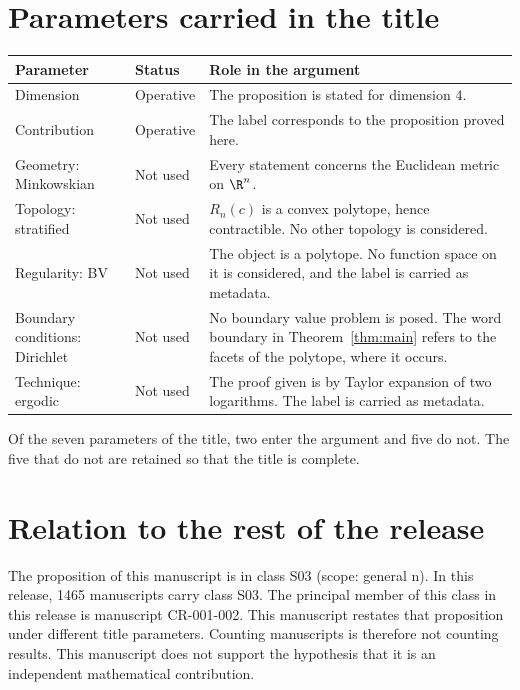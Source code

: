 \documentclass[11pt]{article}
\begin{document}
\section{Parameters carried in the title}\label{sec:params}
\begin{center}
\small
\begin{tabular}{p{}p{}p{}}
\toprule
Parameter & Status & Role in the argument \\
\midrule
Dimension & Operative & The proposition is stated for dimension $4$. \\
Contribution & Operative & The label corresponds to the proposition proved here. \\
Geometry: Minkowskian & Not used & Every statement concerns the Euclidean metric on $\R^n$. \\
Topology: stratified & Not used & $R_n(c)$ is a convex polytope, hence contractible. No other topology is considered. \\
Regularity: BV & Not used & The object is a polytope. No function space on it is considered, and the label is carried as metadata. \\
Boundary conditions: Dirichlet & Not used & No boundary value problem is posed. The word boundary in Theorem~\ref{thm:main} refers to the facets of the polytope, where it occurs. \\
Technique: ergodic & Not used & The proof given is by Taylor expansion of two logarithms. The label is carried as metadata. \\
\bottomrule
\end{tabular}
\end{center}
Of the seven parameters of the title, two enter the argument and five do not. The five that do not are retained so that the title is complete.

\section{Relation to the rest of the release}
The proposition of this manuscript is in class S03 (scope: general n).
In this release, 1465 manuscripts carry class S03. The principal member of this class in this release is manuscript CR-001-002. This manuscript restates that proposition under different title parameters.
Counting manuscripts is therefore not counting results. This manuscript does not support the hypothesis that it is an independent mathematical contribution.
\end{document}
